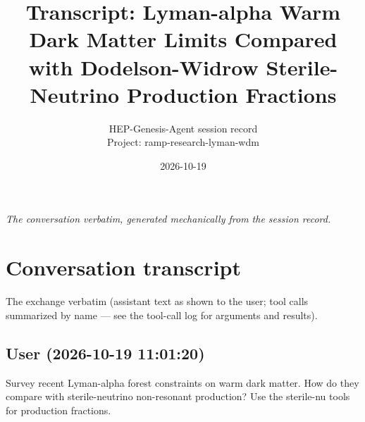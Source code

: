 \documentclass[11pt,a4paper]{article}
\title{Transcript: Lyman-alpha Warm Dark Matter Limits Compared with Dodelson-Widrow Sterile-Neutrino Production Fractions}
\author{HEP-Genesis-Agent session record \\ \small Project: ramp-research-lyman-wdm}
\date{2026-10-19}
\begin{document}
\maketitle
\noindent\textit{\small The conversation verbatim, generated mechanically from the session record.}
\vspace{1em}



\appendix
\section{Conversation transcript}
\label{app:transcript}
The exchange verbatim (assistant text as shown to the user; tool calls summarized by name --- see the tool-call log for arguments and results).
\subsection*{User \small(2026-10-19 11:01:20)}
Survey recent Lyman-alpha forest constraints on warm dark matter. How do they compare with sterile-neutrino non-resonant production? Use the sterile-nu tools for production fractions.
\end{document}
